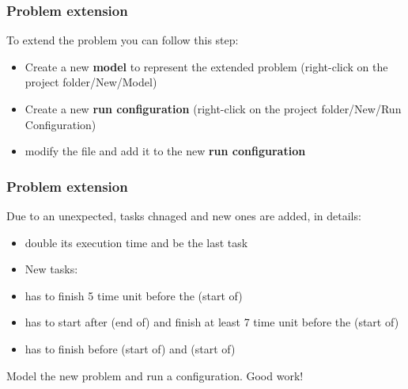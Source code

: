 \begin{frame} \frametitle{Problem extension}

To extend the problem you can follow this step:\pause
\begin{itemize}[<+->]
	\item Create a new \textbf{model} to represent the extended problem (right-click on the project folder/New/Model)
	\item Create a new \textbf{run configuration} (right-click on the project folder/New/Run Configuration)
	\item modify the  file and add it to the new \textbf{run configuration}
\end{itemize}

\end{frame}

\begin{frame} \frametitle{Problem extension}
\pause
Due to an unexpected, tasks chnaged and new ones are added, in details:\pause
\begin{itemize}[<+->]
	\item {} double its execution time and be the last task
	\item New tasks: 
	\item {} has to finish 5 time unit before the (start of)  
	\item {} has to start after (end of)  and finish at least 7 time unit before the (start of) 
	\item {} has to finish before (start of)  and (start of) 
\end{itemize}

\pause\medskip

Model the new problem and run a configuration. Good work!

\end{frame}

